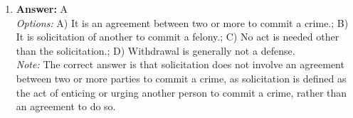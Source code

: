 \documentclass[12pt]{article}
\begin{document}
\begin{enumerate}[label=\arabic*.]
\\ \textit{Note:} The correct answer is "all of the above" because Article III of the U.S. Constitution grants federal courts jurisdiction over a wide range of cases, including those arising under the Constitution, federal laws, treaties, and cases involving diversity of citizenship, thereby encompassing all specified categories.
\item \textbf{Answer:} A
\\ \textit{Options:} A) It is an agreement between two or more to commit a crime.; B) It is solicitation of another to commit a felony.; C) No act is needed other than the solicitation.; D) Withdrawal is generally not a defense.
\\ \textit{Note:} The correct answer is that solicitation does not involve an agreement between two or more parties to commit a crime, as solicitation is defined as the act of enticing or urging another person to commit a crime, rather than an agreement to do so.
\end{enumerate}
\end{document}
